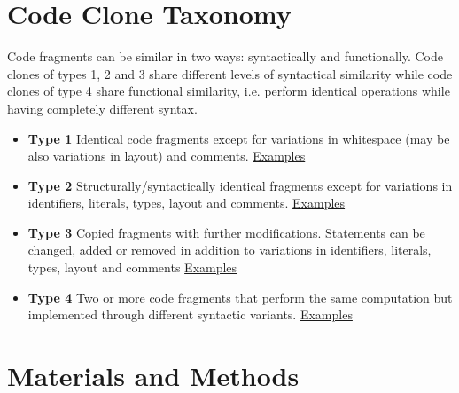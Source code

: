 \documentclass[a0,portrait]{a0poster}
\begin{document}
\begin{multicols}{2}

\section*{Code Clone Taxonomy}

Code fragments can be similar in two ways: syntactically and functionally. Code clones of 
types 1, 2 and 3 share different levels of syntactical similarity while code clones of type 4
share functional similarity, i.e. perform identical operations while having completely different
syntax.

\begin{itemize}
\item \textbf{Type 1} Identical code fragments except for variations in whitespace (may be also
variations in layout) and comments. 
\href{https://gist.github.com/omtcyf0/33a00a4f4406f5933526}{Examples}

\item \textbf{Type 2} Structurally/syntactically identical fragments except for variations in identifiers,
literals, types, layout and comments.
\href{https://gist.github.com/omtcyf0/1e6812f98302f374da53}{Examples}

\item \textbf{Type 3} Copied fragments with further modifications. Statements can be changed,
added or removed in addition to variations in identifiers, literals, types, layout
and comments
\href{https://gist.github.com/omtcyf0/dde978ef6696cf47aff8}{Examples}

\item \textbf{Type 4} Two or more code fragments that perform the same computation but
implemented through different syntactic variants.
\href{https://gist.github.com/omtcyf0/2ce1c8962d9a5552cf35}{Examples}
\end{itemize}


\section*{Materials and Methods}


\end{multicols}
\end{document}
